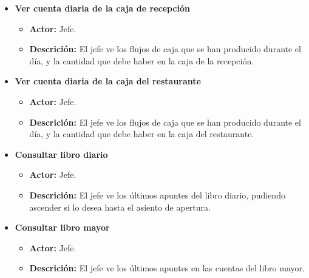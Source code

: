 \documentclass[spanish,a4paper,12pt]{report}		%
\begin{document}
\begin{itemize}
	\hspace{-2 true cm}
	\item \textbf{Ver cuenta diaria de la caja de recepción}
		\begin{itemize}
			\item \textbf{Actor:} Jefe.
			\item \textbf{Descrición:} El jefe ve los flujos de caja que se han producido durante el día, y la cantidad que debe haber en la caja de la recepción.	
		\end {itemize}


	\item \textbf{Ver cuenta diaria de la caja del restaurante}
		\begin{itemize}
			\item \textbf{Actor:} Jefe.
			\item \textbf{Descrición:} El jefe ve los flujos de caja que se han producido durante el día, y la cantidad que debe haber en la caja del restaurante.	
		\end {itemize}


\item \textbf{Consultar libro diario}
		\begin{itemize}
			\item \textbf{Actor:} Jefe.
			\item \textbf{Descrición:} El jefe ve los últimos apuntes del libro diario, pudiendo ascender si lo desea hasta el asiento de apertura.	
		\end {itemize}


\item \textbf{Consultar libro mayor}
		\begin{itemize}
			\item \textbf{Actor:} Jefe.
			\item \textbf{Descrición:} El jefe ve los últimos apuntes en las cuentas del libro mayor. \\
		\end {itemize}


\end{itemize}
\end{document}
